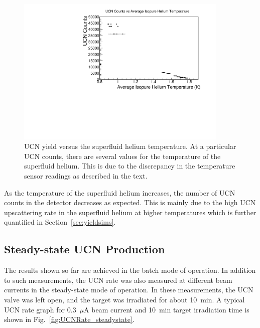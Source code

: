 \begin{figure}[h!]
  \centering
  \includegraphics[width=0.9\textwidth]{counts_vs_temp.pdf}
  \caption[UCN yield versus the superfluid helium temperature]{UCN
    yield versus the superfluid helium temperature. At a particular
    UCN counts, there are several values for the temperature of the
    superfluid helium. This is due to the discrepancy in the
    temperature sensor readings as described in the text.}
  \label{fig:counts_vs_temp}
\end{figure}

As the temperature of the superfluid helium increases, the number of
UCN counts in the detector decreases as expected. This is mainly due
to the high UCN upscattering rate in the superfluid helium at higher
temperatures which is further quantified in
Section~\ref{sec:yieldsims}.


\subsection{Steady-state UCN Production\label{sec:steadystate}}

The results shown so far are achieved in the batch mode of
operation. In addition to such measurements, the UCN rate was also
measured at different beam currents in the steady-state mode of
operation. In these measurements, the UCN valve was left open, and the
target was irradiated for about 10~min. A typical UCN rate graph for
0.3~$\mu$A beam current and 10~min target irradiation time is shown in
Fig.~\ref{fig:UCNRate_steadystate}.


